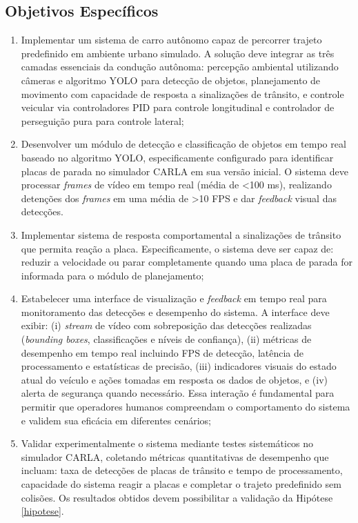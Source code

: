 \documentclass[
	12pt,				%
	oneside, %
	a4paper,			%
	english,			%
	french,				%
	spanish,			%
	brazil				%
	]{abntex2}
\begin{document}
\subsection{Objetivos Específicos} \label{objetivos_esp}
\begin{enumerate}
    \item Implementar um sistema de carro autônomo capaz de percorrer trajeto predefinido em ambiente urbano simulado. A solução deve integrar as três camadas essenciais da condução autônoma: percepção ambiental utilizando câmeras e algoritmo YOLO para detecção de objetos, planejamento de movimento com capacidade de resposta a sinalizações de trânsito, e controle veicular via controladores PID para controle longitudinal e controlador de perseguição pura para controle lateral;
    
    \item Desenvolver um módulo de detecção e classificação de objetos em tempo real baseado no algoritmo YOLO, especificamente configurado para identificar placas de parada no simulador CARLA em sua versão inicial. O sistema deve processar \textit{frames} de vídeo em tempo real (média de <100 ms), realizando detenções dos \textit{frames} em uma média de >10 FPS e dar \textit{feedback} visual das detecções.
    
    \item Implementar sistema de resposta comportamental a sinalizações de trânsito que permita reação a placa. Especificamente, o sistema deve ser capaz de: reduzir a velocidade ou parar completamente quando uma placa de parada for informada para o módulo de planejamento;
    
    \item Estabelecer uma interface de visualização e \textit{feedback} em tempo real para monitoramento das detecções e desempenho do sistema. A interface deve exibir: (i) \textit{stream} de vídeo com sobreposição das detecções realizadas (\textit{bounding boxes}, classificações e níveis de confiança), (ii) métricas de desempenho em tempo real incluindo FPS de detecção, latência de processamento e estatísticas de precisão, (iii) indicadores visuais do estado atual do veículo e ações tomadas em resposta os dados de objetos, e (iv) alerta de segurança quando necessário. Essa interação é fundamental para permitir que operadores humanos compreendam o comportamento do sistema e validem sua eficácia em diferentes cenários;
    
    \item Validar experimentalmente o sistema mediante testes sistemáticos no simulador CARLA, coletando métricas quantitativas de desempenho que incluam: taxa de detecções de placas de trânsito e tempo de processamento, capacidade do sistema reagir a placas e completar o trajeto predefinido sem colisões. Os resultados obtidos devem possibilitar a validação da Hipótese \ref{hipotese}.
\end{enumerate}
\end{document}
